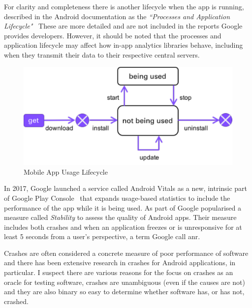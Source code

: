 For clarity and completeness there is another lifecycle when the app is running, described in the Android documentation as the \emph{``Processes and Application Lifecycle"}~ These are more detailed and are not included in the reports Google provides developers. %
However, it should be noted that the processes and application lifecycle may affect how in-app analytics libraries behave, including when they transmit their data to their respective central servers.


\begin{figure}
    \includegraphics[width=\linewidth]{images/mobile_app_usage_lifecycle.pdf}
    \caption{Mobile App Usage Lifecycle}
    \label{fig:mobile_app_usage_lifecycle}
\end{figure}

In 2017, Google launched a service called Android Vitals as a new, intrinsic part of Google Play Console~ that expands usage-based statistics to include the performance of the app while it is being used. As part of  Google popularised a measure called \emph{Stability} to assess the quality of Android apps. Their measure includes both crashes and when an application freezes or is unresponsive for at least 5 seconds from a user's perspective, a term Google call \Gls{anr}.

Crashes are often considered a concrete measure of poor performance of software and there has been extensive research in crashes for Android applications, in particular. I suspect there are various reasons for the focus on crashes as an oracle for testing software, crashes are unambiguous (even if the causes are not) and they are also binary so easy to determine whether software has, or has not, crashed. 


